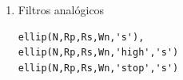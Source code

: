 \begin{enumerate}
\begin{enumerate}
                \item   Filtros anal\'{o}gicos
\begin{verbatim}
ellip(N,Rp,Rs,Wn,'s'),
ellip(N,Rp,Rs,Wn,'high','s')
ellip(N,Rp,Rs,Wn,'stop','s')
\end{verbatim}
        \end{enumerate}

\end{enumerate}

%
%
%
%
%
%
%
%
%
%
%

